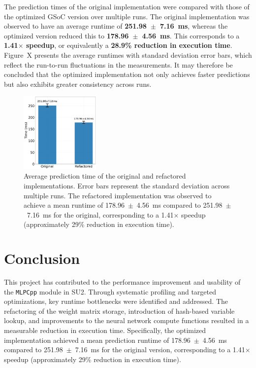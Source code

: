 \documentclass{article}
\begin{document}
The prediction times of the original implementation were compared with those of 
the optimized GSoC version over multiple runs. The original implementation was 
observed to have an average runtime of \textbf{251.98~$\pm$~7.16~ms}, whereas the 
optimized version reduced this to \textbf{178.96~$\pm$~4.56~ms}. This corresponds 
to a \textbf{1.41$\times$ speedup}, or equivalently a \textbf{28.9\% reduction in 
execution time}. Figure~X presents the average runtimes with standard deviation 
error bars, which reflect the run-to-run fluctuations in the measurements. It may 
therefore be concluded that the optimized implementation not only achieves faster 
predictions but also exhibits greater consistency across runs.


\begin{figure}[ht]
    \centering
    \includegraphics[width=0.35\textwidth]{timings_plot.pdf}
    \caption{Average prediction time of the original and refactored implementations. 
    Error bars represent the standard deviation across multiple runs. 
    The refactored implementation was observed to achieve a mean runtime of 
    178.96~$\pm$~4.56~ms compared to 251.98~$\pm$~7.16~ms for the original, 
    corresponding to a 1.41$\times$ speedup (approximately 29\% reduction in execution time).}
    \label{fig:timings}
\end{figure}

\section{Conclusion}
\label{sec:conclusion}

This project has contributed to the performance improvement and usability of the \texttt{MLPCpp} module in SU2. 
Through systematic profiling and targeted optimizations, key runtime bottlenecks were identified and 
addressed. The refactoring of the weight matrix storage, introduction of hash-based variable lookup, and 
improvements to the neural network compute functions resulted in a measurable reduction in execution 
time. Specifically, the optimized implementation achieved a mean prediction runtime of 
178.96~$\pm$~4.56~ms compared to 251.98~$\pm$~7.16~ms for the original version, corresponding to a 
1.41$\times$ speedup (approximately 29\% reduction in execution time). 
\end{document}
